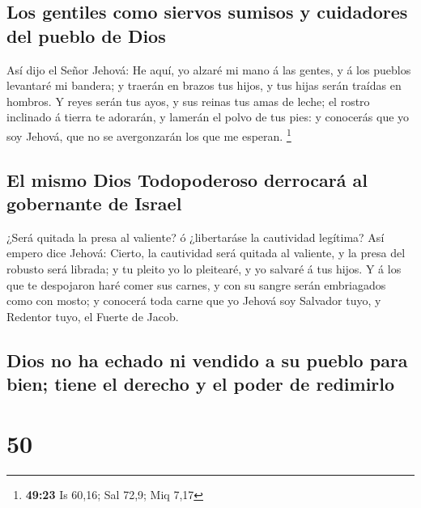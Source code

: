 \hypertarget{los-gentiles-como-siervos-sumisos-y-cuidadores-del-pueblo-de-dios}{%
\subsection{Los gentiles como siervos sumisos y cuidadores del pueblo de
Dios}\label{los-gentiles-como-siervos-sumisos-y-cuidadores-del-pueblo-de-dios}}

 Así dijo el Señor Jehová: He aquí, yo alzaré mi mano á las
gentes, y á los pueblos levantaré mi bandera; y traerán en brazos tus
hijos, y tus hijas serán traídas en hombros.  Y reyes serán
tus ayos, y sus reinas tus amas de leche; el rostro inclinado á tierra
te adorarán, y lamerán el polvo de tus pies: y conocerás que yo soy
Jehová, que no se avergonzarán los que me esperan. \footnote{\textbf{49:23}
  Is 60,16; Sal 72,9; Miq 7,17}

\hypertarget{el-mismo-dios-todopoderoso-derrocaruxe1-al-gobernante-de-israel}{%
\subsection{El mismo Dios Todopoderoso derrocará al gobernante de
Israel}\label{el-mismo-dios-todopoderoso-derrocaruxe1-al-gobernante-de-israel}}

 ¿Será quitada la presa al valiente? ó ¿libertaráse la
cautividad legítima?  Así empero dice Jehová: Cierto, la
cautividad será quitada al valiente, y la presa del robusto será
librada; y tu pleito yo lo pleitearé, y yo salvaré á tus hijos.
 Y á los que te despojaron haré comer sus carnes, y con su
sangre serán embriagados como con mosto; y conocerá toda carne que yo
Jehová soy Salvador tuyo, y Redentor tuyo, el Fuerte de Jacob.

\hypertarget{dios-no-ha-echado-ni-vendido-a-su-pueblo-para-bien-tiene-el-derecho-y-el-poder-de-redimirlo}{%
\subsection{Dios no ha echado ni vendido a su pueblo para bien; tiene el
derecho y el poder de
redimirlo}\label{dios-no-ha-echado-ni-vendido-a-su-pueblo-para-bien-tiene-el-derecho-y-el-poder-de-redimirlo}}

\hypertarget{section-49}{%
\section{50}\label{section-49}}

